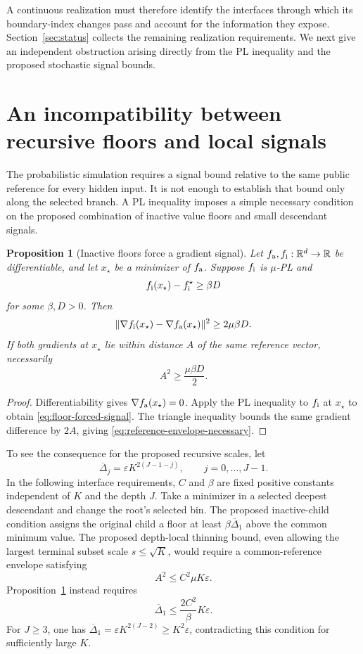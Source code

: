 \documentclass[11pt,a4paper]{article}
\newcommand{\R}{\mathbb R}
\newcommand{\eps}{\varepsilon}
\newtheorem{proposition}[theorem]{Proposition}
\theoremstyle{definition}
\theoremstyle{remark}
\begin{document}
A continuous realization must therefore identify the interfaces through
which its boundary-index changes pass and account for the information
they expose.  Section~\ref{sec:status} collects the remaining realization
requirements.  We next give an independent obstruction arising directly
from the PL inequality and the proposed stochastic signal bounds.


\section{An incompatibility between recursive floors and local signals}
\label{sec:signal-obstruction}

The probabilistic simulation requires a signal bound relative to the same
public reference for every hidden input.  It is not enough to establish
that bound only along the selected branch.  A PL inequality imposes a
simple necessary condition on the proposed combination of inactive value
floors and small descendant signals.

\begin{proposition}[Inactive floors force a gradient signal]
\label{prop:floor-signal}
Let $f_{\rm a},f_{\rm i}:\R^d\to\R$ be differentiable, and let $x_\star$
be a minimizer of $f_{\rm a}$.  Suppose $f_{\rm i}$ is $\mu$-PL and
\[
 f_{\rm i}(x_\star)-f_{\rm i}^\star\ge\beta D
\]
for some $\beta,D>0$.  Then
\begin{equation}
 \|\nabla f_{\rm i}(x_\star)-\nabla f_{\rm a}(x_\star)\|^2
 \ge 2\mu\beta D.
 \label{eq:floor-forced-signal}
\end{equation}
If both gradients at $x_\star$ lie within distance $A$ of the same reference
vector, necessarily
\begin{equation}
 A^2\ge\frac{\mu\beta D}{2}.
 \label{eq:reference-envelope-necessary}
\end{equation}
\end{proposition}

\begin{proof}
Differentiability gives $\nabla f_{\rm a}(x_\star)=0$.  Apply the PL
inequality to $f_{\rm i}$ at $x_\star$ to obtain
\eqref{eq:floor-forced-signal}.  The triangle inequality bounds the same
gradient difference by $2A$, giving
\eqref{eq:reference-envelope-necessary}.
\end{proof}

To see the consequence for the proposed recursive scales, let
\[
 \overline\Delta_j=\eps K^{2(J-1-j)},\qquad j=0,\ldots,J-1.
\]
In the following interface requirements, $C$ and $\beta$ are fixed
positive constants independent of $K$ and the depth $J$.
Take a minimizer in a selected deepest descendant and change the root's
selected bin.  The proposed inactive-child condition assigns the original
child a floor at least $\beta\overline\Delta_1$ above the common minimum
value.  The proposed depth-local thinning bound, even allowing the largest
terminal subset scale $s\le\sqrt K$, would require a common-reference
envelope satisfying
\[
 A^2\le C^2\mu K\eps.
\]
Proposition~\ref{prop:floor-signal} instead requires
\[
 \overline\Delta_1\le\frac{2C^2}{\beta}K\eps.
\]
For $J\ge3$, one has
$\overline\Delta_1=\eps K^{2(J-2)}\ge K^2\eps$, contradicting this
condition for sufficiently large $K$.
\end{document}
